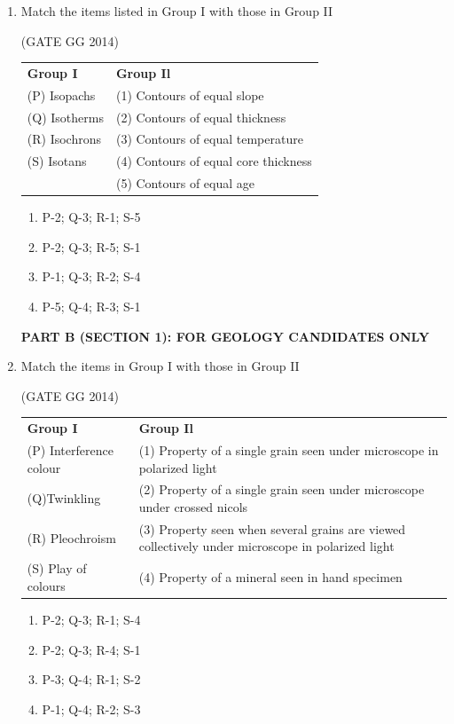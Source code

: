 \documentclass[journal]{IEEEtran}
\begin{document}
\begin{enumerate}[start=1]
\item Match the items listed in Group I with those in Group II

\hfill{(GATE GG 2014)}\\
\begin{tabular}{ l l }
\textbf{Group I} & \textbf{Group Il}\\
(P) Isopachs & (1) Contours of equal slope\\
(Q) Isotherms & (2) Contours of equal thickness\\
(R) Isochrons & (3) Contours of equal temperature\\
(S) Isotans & (4) Contours of equal core thickness\\
 & (5) Contours of equal age
 \end{tabular}
 \begin{multicols}{2}
     \begin{enumerate}
    \item  P-2; Q-3; R-1; S-5
\item  P-2; Q-3; R-5; S-1
\item P-1; Q-3; R-2; S-4
\item P-5; Q-4; R-3; S-1
\end{enumerate}
 \end{multicols}

\vspace{5cm}
\textbf{PART B (SECTION 1): FOR GEOLOGY CANDIDATES ONLY}
\item Match the items in Group I with those in Group II

\hfill{(GATE GG 2014)}\\
\begin{tabular}{ l l }
\textbf{Group I} & \textbf{Group Il}\\
(P) Interference colour & (1) Property of a single grain seen under microscope in polarized light\\

(Q)Twinkling & (2) Property of a single grain seen under microscope under crossed nicols\\

(R) Pleochroism & (3) Property seen when several grains are viewed collectively under microscope in polarized light\\

(S) Play of colours & (4) Property of a mineral seen in hand specimen
\end{tabular}
\begin{multicols}{2}
    \begin{enumerate}
    \item  P-2; Q-3; R-1; S-4
    \item P-2; Q-3; R-4; S-1
    \item P-3; Q-4; R-1; S-2
    \item P-1; Q-4; R-2; S-3
\end{enumerate}
\end{multicols}



\end{enumerate}
\end{document}
